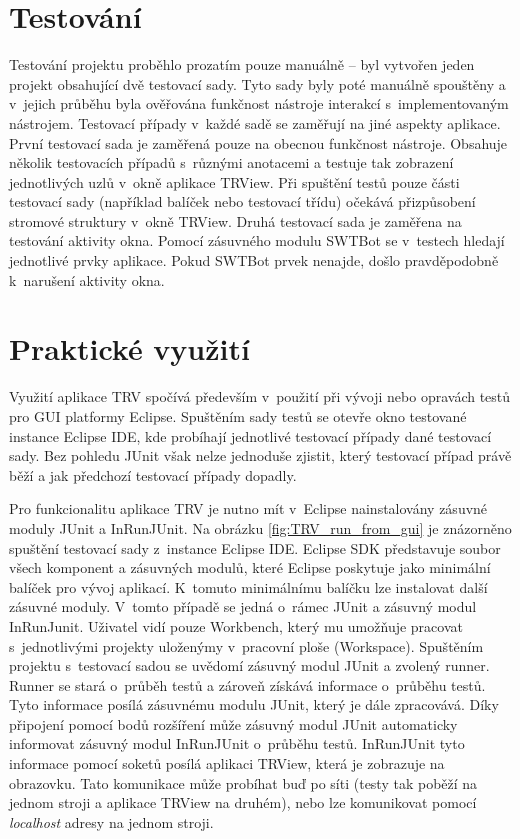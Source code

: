   \section{Testování}
  Testování projektu proběhlo prozatím pouze manuálně -- byl vytvořen jeden projekt obsahující dvě testovací sady. Tyto sady byly poté manuálně spouštěny a v~jejich průběhu byla ověřována funkčnost nástroje interakcí s~implementovaným nástrojem. Testovací případy v~každé sadě se zaměřují na jiné aspekty aplikace. První testovací sada je zaměřená pouze na obecnou funkčnost nástroje. Obsahuje několik testovacích případů s~různými anotacemi a testuje tak zobrazení jednotlivých uzlů v~okně aplikace TRView. Při spuštění testů pouze části testovací sady (například balíček nebo testovací třídu) očekává přizpůsobení stromové struktury v~okně TRView. Druhá testovací sada je zaměřena na testování aktivity okna. Pomocí zásuvného modulu SWTBot se v~testech hledají jednotlivé prvky aplikace. Pokud SWTBot prvek nenajde, došlo pravděpodobně k~narušení aktivity okna.

  \section{Praktické využití}
  Využití aplikace TRV spočívá především v~použití při vývoji nebo opravách testů pro GUI platformy Eclipse. Spuštěním sady testů se otevře okno testované instance Eclipse IDE, kde probíhají jednotlivé testovací případy dané testovací sady. Bez pohledu JUnit však nelze jednoduše zjistit, který testovací případ právě běží a jak předchozí testovací případy dopadly.

  Pro funkcionalitu aplikace TRV je nutno mít v~Eclipse nainstalovány zásuvné moduly JUnit a InRunJUnit. Na obrázku \ref{fig:TRV_run_from_gui} je znázorněno spuštění testovací sady z~instance Eclipse IDE. Eclipse SDK představuje soubor všech komponent a zásuvných modulů, které Eclipse poskytuje jako minimální balíček pro vývoj aplikací. K~tomuto minimálnímu balíčku lze instalovat další zásuvné moduly. V~tomto případě se jedná o~rámec JUnit a zásuvný modul InRunJunit. Uživatel vidí pouze Workbench, který mu umožňuje pracovat s~jednotlivými projekty uloženýmy v~pracovní ploše (Workspace). Spuštěním projektu s~testovací sadou se uvědomí zásuvný modul JUnit a zvolený runner. Runner se stará o~průběh testů a zároveň získává informace o~průběhu testů. Tyto informace posílá zásuvnému modulu JUnit, který je dále zpracovává. Díky připojení pomocí bodů rozšíření může zásuvný modul JUnit automaticky informovat zásuvný modul InRunJUnit o~průběhu testů. InRunJUnit tyto informace pomocí soketů posílá aplikaci TRView, která je zobrazuje na obrazovku. Tato komunikace může probíhat buď po síti (testy tak poběží na jednom stroji a aplikace TRView na druhém), nebo lze komunikovat pomocí \emph{localhost} adresy na jednom stroji.


